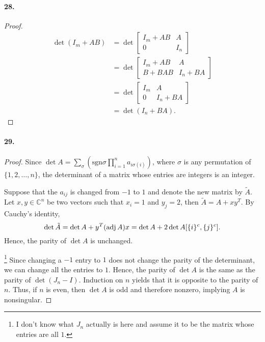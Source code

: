   \paragraph{28.}
  \begin{proof}
    \begin{align*}
      \det(I_m+AB) 
      &= \det\begin{bmatrix}
        I_m+AB & A \\ 0 & I_n
      \end{bmatrix} \\
      &= \det\begin{bmatrix}
        I_m+AB & A \\ B+BAB & I_n + BA 
      \end{bmatrix} \\
      &= \det\begin{bmatrix}
        I_m & A \\ 0 & I_n+BA
      \end{bmatrix} \\
      &= \det (I_n+BA).
    \end{align*}
  \end{proof}

  \paragraph{29.}
  \begin{proof}
    Since $\det A=\sum_\sigma(\text{sgn}\sigma \prod_{i=1}^n a_{i\sigma(i)})$, 
    where $\sigma$ is any permutation of $\{1,2,\dots, n\}$, the determinant of 
    a matrix whose entries are integers is an integer.\par
    Suppose that the $a_{ij}$ is changed from $-1$ to $1$ and denote the new 
    matrix by $\tilde{A}$. Let $x,y\in\mathbb{C}^n$ be two vectors such that 
    $x_i=1$ and $y_j=2$, then $\tilde{A} = A + xy^T$. By Cauchy's identity,
    \[
      \det\tilde{A} = \det A + y^T(\operatorname{adj} A)x = \det A + 2\det A[\{i\}^c,\{j\}^c].
    \]
    Hence, the parity of $\det A$ is unchanged.\par
    \footnote{I don't know what $J_n$ actually is here and assume it to be the 
    matrix whose entries are all $1$.} Since changing a $-1$ entry to $1$ does 
    not change the parity of the determinant, we can change all the entries to 
    $1$. Hence, the parity of $\det A$ is the same as the parity of $\det(J_n-
    I)$. Induction on $n$ yields that it is opposite to the parity of $n$. Thus,
    if $n$ is even, then $\det A$ is odd and therefore nonzero, implying $A$ is 
    nonsingular.
  \end{proof}

